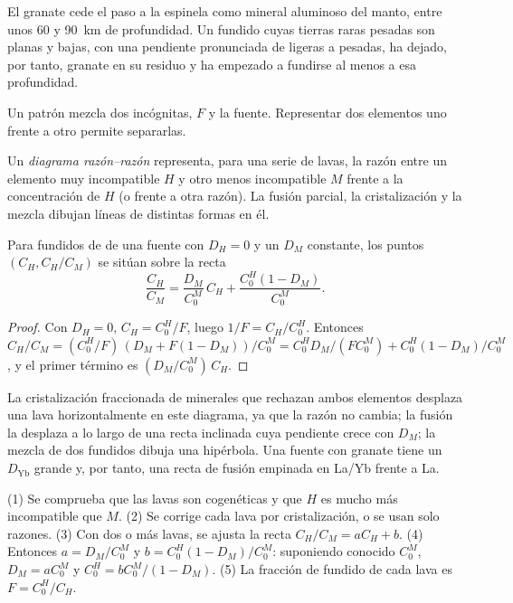 El granate cede el paso a la espinela como mineral aluminoso del manto, entre unos 60
y \qty{90}{km} de profundidad. Un fundido cuyas tierras raras pesadas son planas y bajas, con una
pendiente pronunciada de ligeras a pesadas, ha dejado, por tanto, granate en su residuo y
ha empezado a fundirse al menos a esa profundidad.

Un patrón mezcla dos incógnitas, $F$ y la fuente. Representar dos elementos
uno frente a otro permite separarlas.

\begin{definition}\label{def:b3:trace-element-modelling:ratios}
Un \emph{diagrama razón--razón} representa, para una serie
de lavas, la razón entre un elemento muy incompatible $H$ y otro menos
incompatible $M$ frente a la concentración de $H$ (o frente a otra
razón). La fusión parcial, la cristalización y la mezcla dibujan líneas de distintas
formas en él.
\end{definition}

\begin{proposition}\label{prop:b3:trace-element-modelling:line}
Para fundidos de  de una fuente con $D_H = 0$ y un $D_M$ constante, los puntos
$(C_H, C_H/C_M)$ se sitúan sobre la recta
\[
\frac{C_H}{C_M} = \frac{D_M}{C_0^M}\,C_H + \frac{C_0^H(1 - D_M)}{C_0^M}.
\]
\end{proposition}

\begin{proof}
\sloppy Con $D_H = 0$, $C_H = C_0^H/F$, luego $1/F = C_H/C_0^H$. Entonces
$C_H/C_M = (C_0^H/F)\,(D_M + F(1 - D_M))/C_0^M = C_0^HD_M/(FC_0^M) +
C_0^H(1 - D_M)/C_0^M$, y el primer término es $(D_M/C_0^M)\,C_H$.
\end{proof}

La cristalización fraccionada de minerales que rechazan ambos elementos desplaza una lava
horizontalmente en este diagrama, ya que la razón no cambia; la fusión la desplaza
a lo largo de una recta inclinada cuya pendiente crece con $D_M$; la mezcla de dos fundidos dibuja una
hipérbola. Una fuente con granate tiene un $D_{\mathrm{Yb}}$ grande y, por tanto, una
recta de fusión empinada en La/Yb frente a La.

\begin{method}\label{met:b3:trace-element-modelling:invert}
(1) Se comprueba que las lavas son cogenéticas y que $H$ es mucho más incompatible
que $M$. (2) Se corrige cada lava por cristalización, o se usan solo razones.
(3) Con dos o más lavas, se ajusta la recta $C_H/C_M = aC_H + b$. (4) Entonces
$a = D_M/C_0^M$ y $b = C_0^H(1 - D_M)/C_0^M$: suponiendo conocido $C_0^M$, $D_M =
aC_0^M$ y $C_0^H = bC_0^M/(1 - D_M)$. (5) La fracción de fundido de cada lava es
$F = C_0^H/C_H$.
\end{method}

